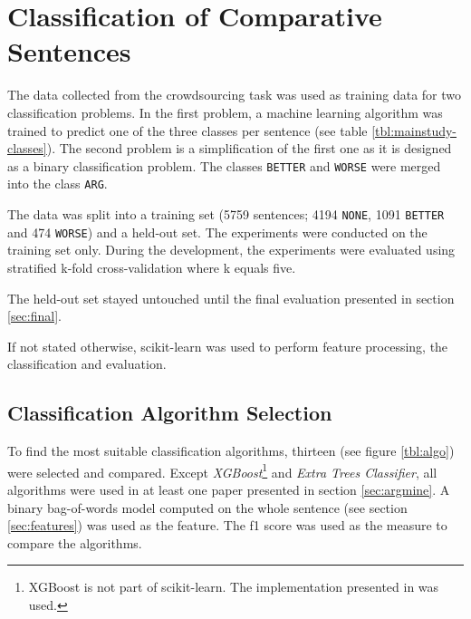 \chapter{Classification of Comparative Sentences}
The data collected from the crowdsourcing task was used as training data for two classification problems. In the first problem, a machine learning algorithm was trained to predict one of the three classes per sentence (see table \ref{tbl:mainstudy-classes}). The second problem is a simplification of the first one as it is designed as a binary classification problem. The classes \texttt{BETTER} and \texttt{WORSE} were merged into the class \texttt{ARG}.

The data was split into a training set (5759 sentences; 4194 \texttt{NONE}, 1091 \texttt{BETTER} and 474 \texttt{WORSE}) and a held-out set.
The experiments were conducted on the training set only. During the development, the experiments were evaluated using stratified k-fold cross-validation where k equals five. 

The held-out set stayed untouched until the final evaluation presented in section \ref{sec:final}.

If not stated otherwise, scikit-learn \cite{scikit-learn} was used to perform feature processing, the classification and evaluation.

\section{Classification Algorithm Selection}


To find the most suitable classification algorithms, thirteen (see figure \ref{tbl:algo}) were selected and compared. Except \emph{XGBoost}\footnote{XGBoost is not part of scikit-learn. The implementation presented in \cite{DBLP:journals/corr/ChenG16} was used.} and \emph{Extra Trees Classifier}, all algorithms were used in at least one paper presented in section \ref{sec:argmine}. A binary bag-of-words model computed on the whole sentence (see section \ref{sec:features}) was used as the feature. The f1 score was used as the measure to compare the algorithms. 

